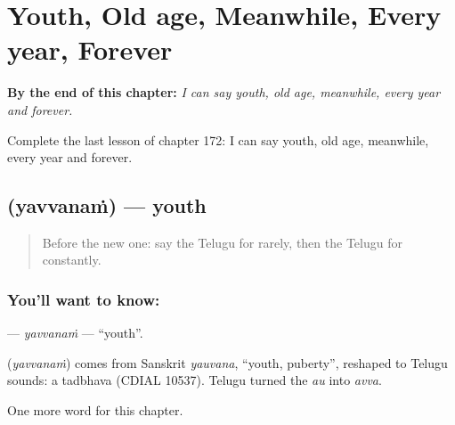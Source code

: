 
\chapter{Youth, Old age, Meanwhile, Every year, Forever}
\label{ch:te-youth-old-age-meanwhile-every-year-forever}

\begin{chapteropening}
\textbf{By the end of this chapter:} \emph{I can say youth, old age, meanwhile, every year and forever.}

Complete the last lesson of chapter 172: I can say youth, old age, meanwhile, every year and forever.
\end{chapteropening}

\section[\texorpdfstring{\te{యవ్వనం} (yavvanaṁ)}{యవ్వనం (yavvanaṁ)}]{ (yavvanaṁ) — youth}

\label{lesson:TE-C172-yavvanam}



\begin{quote}
Before the new one: say the Telugu for rarely, then the Telugu for constantly.
\end{quote}

\subsection*{You'll want to know: }
\textbf{} — \emph{yavvanaṁ} — \textquotedblleft{}youth\textquotedblright{}.

\begin{cousinweb}
\textbf{} (\emph{yavvanaṁ}) comes from Sanskrit \emph{yauvana}, \textquotedblleft{}youth, puberty\textquotedblright{}, reshaped to Telugu sounds: a tadbhava (CDIAL 10537). Telugu turned the \emph{au} into \emph{avva}.
\end{cousinweb}

\begin{grammarlens}[title={What you've built}]
One more word for this chapter.
\end{grammarlens}

